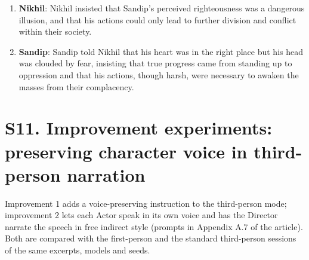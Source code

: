 \documentclass[10pt]{article}
\begin{document}
\begin{enumerate}
\item \textbf{Nikhil}: Nikhil insisted that Sandip's perceived righteousness was a dangerous illusion, and that his actions could only lead to further division and conflict within their society.

\item \textbf{Sandip}: Sandip told Nikhil that his heart was in the right place but his head was clouded by fear, insisting that true progress came from standing up to oppression and that his actions, though harsh, were necessary to awaken the masses from their complacency.

\end{enumerate}

\section*{S11. Improvement experiments: preserving character voice in third-person narration}

Improvement 1 adds a voice-preserving instruction to the third-person mode; improvement 2 lets each Actor speak in its own voice and has the Director narrate the speech in free indirect style (prompts in Appendix A.7 of the article). Both are compared with the first-person and the standard third-person sessions of the same excerpts, models and seeds.
\end{document}

